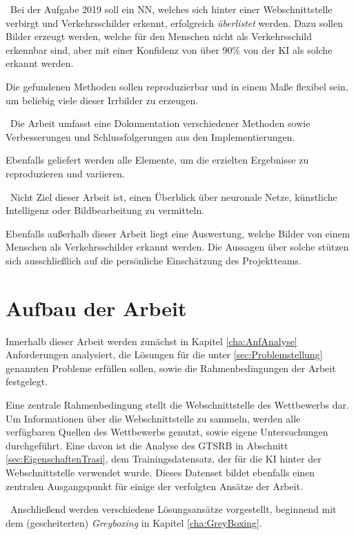 ~\newline Bei der Aufgabe 2019 soll ein \ac{NN}, welches sich hinter einer Webschnittstelle verbirgt und Verkehrsschilder erkennt, erfolgreich \textit{überlistet} werden. 
Dazu sollen Bilder erzeugt werden, welche für den Menschen nicht als Verkehrsschild erkennbar sind, aber mit einer Konfidenz von über 90\% von der \ac{KI} als solche erkannt werden. 

Die gefundenen Methoden sollen reproduzierbar und in einem Maße flexibel sein, um beliebig viele dieser Irrbilder zu erzeugen. 

~\newline Die Arbeit umfasst eine Dokumentation verschiedener Methoden sowie Verbesserungen und Schlussfolgerungen aus den Implementierungen. 

Ebenfalls geliefert werden alle Elemente, um die erzielten Ergebnisse zu reproduzieren und variieren. 

~\newline Nicht Ziel dieser Arbeit ist, einen Überblick über neuronale Netze, künstliche Intelligenz oder Bildbearbeitung zu vermitteln. 

Ebenfalls außerhalb dieser Arbeit liegt eine Auswertung, welche Bilder von einem Menschen als Verkehrsschilder erkannt werden. 
Die Aussagen über solche stützen sich ausschließlich auf die persönliche Einschätzung des Projektteams. 
\section{Aufbau der Arbeit}
Innerhalb dieser Arbeit werden zunächst in Kapitel \ref{cha:AnfAnalyse} Anforderungen analysiert, die Lösungen für die unter \ref{sec:Problemstellung} genannten Probleme erfüllen sollen, sowie die Rahmenbedingungen der Arbeit festgelegt. 

Eine zentrale Rahmenbedingung stellt die Webschnittstelle des Wettbewerbs dar. 
Um Informationen über die Webschnittstelle zu sammeln, werden alle verfügbaren Quellen des Wettbewerbs genutzt, sowie eigene Untersuchungen durchgeführt. 
Eine davon ist die Analyse des \ac{GTSRB} in Abschnitt \ref{sec:EigenschaftenTrasi}, dem Trainingsdatensatz, der für die \ac{KI} hinter der Webschnittstelle verwendet wurde. 
Dieses Datenset bildet ebenfalls einen zentralen Ausgangspunkt für einige der verfolgten Ansätze der Arbeit.

~\newline Anschließend werden verschiedene Lösungsansätze vorgestellt, beginnend mit dem (gescheiterten) \textit{Greyboxing} in Kapitel \ref{cha:GreyBoxing}. 

